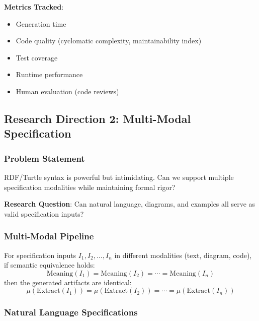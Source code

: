 \textbf{Metrics Tracked}:
\begin{itemize}
    \item Generation time
    \item Code quality (cyclomatic complexity, maintainability index)
    \item Test coverage
    \item Runtime performance
    \item Human evaluation (code reviews)
\end{itemize}

\subsection{Research Direction 2: Multi-Modal Specification}

\subsubsection{Problem Statement}

RDF/Turtle syntax is powerful but intimidating. Can we support multiple specification modalities while maintaining formal rigor?

\textbf{Research Question}: Can natural language, diagrams, and examples all serve as valid specification inputs?

\subsubsection{Multi-Modal Pipeline}

\begin{theorem}
    For specification inputs $I_1, I_2, \ldots, I_n$ in different modalities (text, diagram, code), if semantic equivalence holds:
    \begin{equation}
        \text{Meaning}(I_1) = \text{Meaning}(I_2) = \cdots = \text{Meaning}(I_n)
    \end{equation}
    then the generated artifacts are identical:
    \begin{equation}
        \mu(\text{Extract}(I_1)) = \mu(\text{Extract}(I_2)) = \cdots = \mu(\text{Extract}(I_n))
    \end{equation}
\end{theorem}

\subsubsection{Natural Language Specifications}

